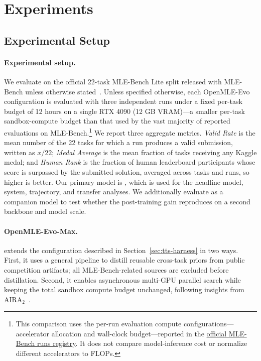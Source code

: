 \section{Experiments}
\label{sec:experiments}


\subsection{Experimental Setup}
\label{sec:experimental-setup}

\paragraph{Experimental setup.}
We evaluate on the official 22-task MLE-Bench Lite split released with MLE-Bench unless otherwise stated~\citep{chan2024mlebench}.
Unless specified otherwise, each OpenMLE-Evo configuration is evaluated with three independent runs under a fixed per-task budget of 12 hours on a single RTX 4090 (12 GB VRAM)---a smaller per-task sandbox-compute budget than that used by the vast majority of reported evaluations on MLE-Bench.\footnote{This comparison uses the per-run evaluation compute configurations---accelerator allocation and wall-clock budget---reported in the \href{https://github.com/openai/mle-bench/tree/main/runs\#readme}{official MLE-Bench runs registry}. It does not compare model-inference cost or normalize different accelerators to FLOPs.}
We report three aggregate metrics. \emph{Valid Rate} is the mean number of the 22 tasks for which a run produces a valid submission, written as $x/22$; \emph{Medal Average} is the mean fraction of tasks receiving any Kaggle medal; and \emph{Human Rank} is the fraction of human leaderboard participants whose score is surpassed by the submitted solution, averaged across tasks and runs, so higher is better.
Our primary model is \thirtyfivebmodel{}, which is used for the headline model, system, trajectory, and transfer analyses. We additionally evaluate \thirtybmodel{} as a companion model to test whether the post-training gain reproduces on a second backbone and model scale.


\paragraph{OpenMLE-Evo-Max.}
\openmleevomax{} extends the \openmleevo{} configuration described in Section~\ref{sec:tts-harness} in two ways.
First, it uses a general pipeline to distill reusable cross-task priors from public competition artifacts; all MLE-Bench-related sources are excluded before distillation.
Second, it enables asynchronous multi-GPU parallel search while keeping the total sandbox compute budget unchanged, following insights from AIRA$_2$~\citep{hambardzumyan2026aira_2}.

